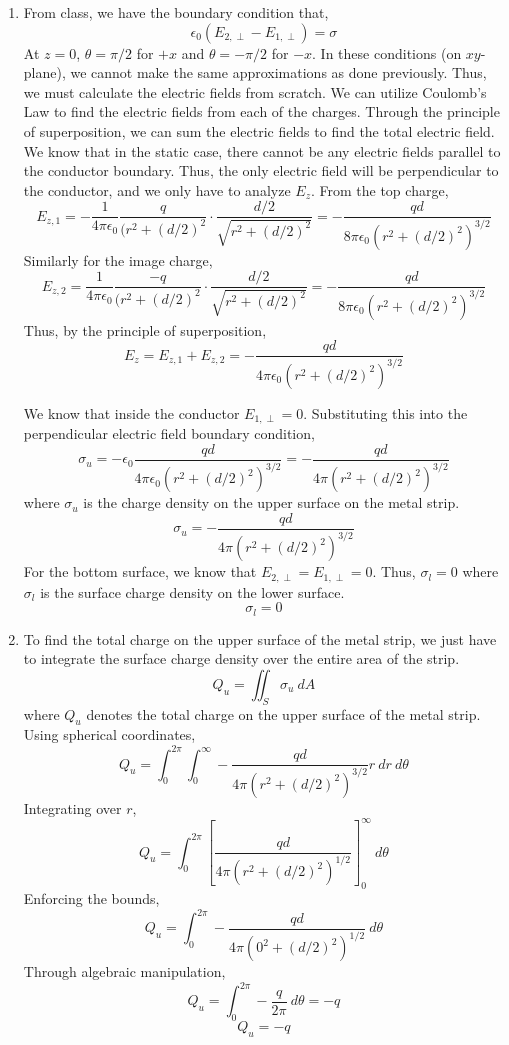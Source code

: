 \documentclass[12pt]{article}
\begin{document}
\begin{enumerate}
\begin{enumerate}
		\item [c.]
		From class, we have the boundary condition that,
		\[\epsilon_0 ( E_{2,\perp} - E_{1,\perp})=\sigma\]
		At $z=0$, $\theta=\pi/2$ for $+x$ and $\theta = -\pi/2$ for $-x$.
		In these conditions (on $xy$-plane), we cannot make the same approximations as done previously.
		Thus, we must calculate the electric fields from scratch.
		We can utilize Coulomb's Law to find the electric fields from each of the charges.
		Through the principle of superposition, we can sum the electric fields to find the total electric field.
		We know that in the static case, there cannot be any electric fields parallel to the conductor boundary.
		Thus, the only electric field will be perpendicular to the conductor, and we only have to analyze $E_z$.
		From the top charge,
		\[E_{z,1} = -\frac{1}{4\pi\epsilon_0}\frac{q}{(r^2+(d/2)^2}\cdot \frac{d/2}{\sqrt{r^2+(d/2)^2}}=-\frac{qd}{8\pi\epsilon_0\left(r^2+(d/2)^2\right)^{3/2}}\]
		Similarly for the image charge,
		\[E_{z,2}=\frac{1}{4\pi\epsilon_0}\frac{-q}{(r^2+(d/2)^2}\cdot \frac{d/2}{\sqrt{r^2+(d/2)^2}}=-\frac{qd}{8\pi\epsilon_0\left(r^2+(d/2)^2\right)^{3/2}}\]
		Thus, by the principle of superposition,
		\[E_z = E_{z,1}+E_{z,2}=-\frac{qd}{4\pi\epsilon_0(r^2+(d/2)^2)^{3/2}}\]
		
		We know that inside the  conductor $E_{1,\perp}=0$.
		Substituting this into the perpendicular electric field boundary condition,
		\[\sigma_u = -\epsilon_0\frac{qd}{4\pi\epsilon_0(r^2+(d/2)^2)^{3/2}}=-\frac{qd}{4\pi(r^2+(d/2)^2)^{3/2}}\]
		where $\sigma_u$ is the charge density on the upper surface on the metal strip.
		\[\boxed{\sigma_u = -\frac{qd}{4\pi(r^2+(d/2)^2)^{3/2}}}\]
		For the bottom surface, we know that $E_{2,\perp}=E_{1,\perp}=0$.
		Thus, $\sigma_l=0$ where $\sigma_l$ is the surface charge density on the lower surface.
		\[\boxed{\sigma_l = 0}\]

		\item [d.]
		To find the total charge on the upper surface of the metal strip, we just have to integrate the surface charge density over the entire area of the strip.
		\[Q_u= \iint_S \sigma_u \: dA\]
		where $Q_u$ denotes the total charge on the upper surface of the metal strip.
		Using spherical coordinates,
		\[Q_u = \int_0^{2\pi}\int_0^{\infty}-\frac{qd}{4\pi (r^2+(d/2)^2)^{3/2}}r \: dr \: d\theta\]
		Integrating over $r$,
		\[Q_u=\int_0^{2\pi}\left[\frac{qd}{4\pi(r^2+(d/2)^2)^{1/2}}\right]_0^{\infty}\: d\theta\]
		Enforcing the bounds,
		\[Q_u=\int_0^{2\pi}-\frac{qd}{4\pi(0^2+(d/2)^2)^{1/2}}\:d\theta\]
		Through algebraic manipulation,
		\[Q_u=\int_0^{2\pi}-\frac{q}{2\pi}\:d\theta=-q\]
		\[\boxed{Q_u=-q}\]






	\end{enumerate}
	
	
\end{enumerate}

		
\end{document}
